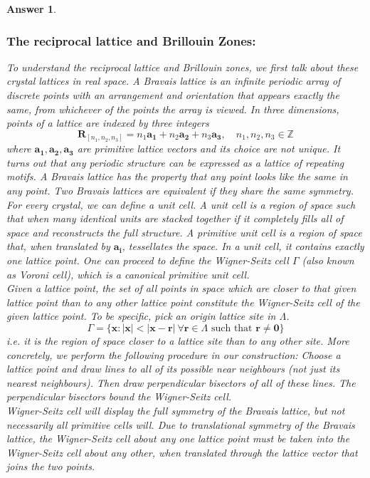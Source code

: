 \documentclass[a4paper]{article}
\newtheorem{ans}{Answer}[subsection]
\theoremstyle{new}
\begin{document}
\begin{ans}
\subsubsection*{The reciprocal lattice and Brillouin Zones:}
To understand the reciprocal lattice and Brillouin zones, we first talk about these crystal lattices in real space. A Bravais lattice is an infinite periodic array of discrete points with an arrangement and orientation that appears exactly the same, from whichever of the points the array is viewed. In three dimensions, points of a lattice are indexed by three integers
$$\mathbf{R}_{[n_1,n_2,n_3]}=n_1\mathbf{a_1}+n_2\mathbf{a_2}+n_3\mathbf{a_3},\quad n_1,n_2,n_3\in\mathbb{Z}$$ 
where $\mathbf{a_1},\mathbf{a_2},\mathbf{a_3}$ are primitive lattice vectors and its choice are not unique. It turns out that any periodic structure can be expressed as a lattice of repeating motifs. A Bravais lattice has the property that any point looks like the same in any point. Two Bravais lattices are equivalent if they share the same symmetry.\\[5pt]
For every crystal, we can define a unit cell. A unit cell is a region of space such that when many identical units are stacked together if it completely fills all of space and reconstructs the full structure. A primitive unit cell is a region of space that, when translated by $\mathbf{a_i}$, tessellates the space. In a unit cell, it contains exactly one lattice point. One can proceed to define the Wigner-Seitz cell $\Gamma$ (also known as Voroni cell), which is a canonical primitive unit cell.\\[5pt]
Given a lattice point, the set of all points in space which are closer to that given lattice point than to any other lattice point constitute the Wigner-Seitz cell of the given lattice point. To be specific, pick an origin lattice site in $\Lambda$.
$$\Gamma=\{\mathbf{x}:|\mathbf{x}|<|\mathbf{x}-\mathbf{r}|~\forall\mathbf{r}\in\Lambda\text{ such that }\mathbf{r}\neq\boldsymbol{0}\}$$
i.e. it is the region of space closer to a lattice site than to any other site. More concretely, we perform the following procedure in our construction: Choose a lattice point and draw lines to all of its possible near neighbours (not just its nearest neighbours). Then draw perpendicular bisectors of all of these lines. The perpendicular bisectors bound the Wigner-Seitz cell.\\[5pt]
Wigner-Seitz cell will display the full symmetry of the Bravais lattice, but not necessarily all primitive cells will.  Due to translational symmetry of the Bravais lattice, the Wigner-Seitz cell about any one lattice point must be taken into the Wigner-Seitz cell about any other, when translated through the lattice vector that joins the two points.\\[5pt]

\end{ans}
\end{document}

